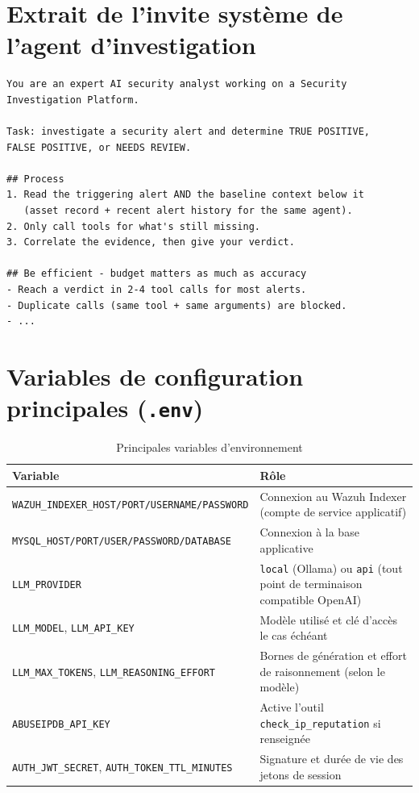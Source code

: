 \section{Extrait de l'invite système de l'agent d'investigation}

\begin{lstlisting}[language={}, caption={Extrait du \textit{system prompt}
de l'AI Investigator}]
You are an expert AI security analyst working on a Security
Investigation Platform.

Task: investigate a security alert and determine TRUE POSITIVE,
FALSE POSITIVE, or NEEDS REVIEW.

## Process
1. Read the triggering alert AND the baseline context below it
   (asset record + recent alert history for the same agent).
2. Only call tools for what's still missing.
3. Correlate the evidence, then give your verdict.

## Be efficient - budget matters as much as accuracy
- Reach a verdict in 2-4 tool calls for most alerts.
- Duplicate calls (same tool + same arguments) are blocked.
- ...
\end{lstlisting}

\section{Variables de configuration principales (\texttt{.env})}

\begin{table}[H]
\centering
\caption{Principales variables d'environnement}
\begin{tabular}{@{}p{5.5cm}p{8cm}@{}}
\toprule
\textbf{Variable} & \textbf{Rôle} \\
\midrule
\texttt{WAZUH\_INDEXER\_HOST/PORT/\allowbreak USERNAME/PASSWORD} & Connexion
au Wazuh Indexer (compte de service applicatif) \\
\texttt{MYSQL\_HOST/PORT/USER/\allowbreak PASSWORD/DATABASE} & Connexion à
la base applicative \\
\texttt{LLM\_PROVIDER} & \texttt{local} (Ollama) ou \texttt{api} (tout
point de terminaison compatible OpenAI) \\
\texttt{LLM\_MODEL}, \texttt{LLM\_API\_KEY} & Modèle utilisé et clé
d'accès le cas échéant \\
\texttt{LLM\_MAX\_TOKENS}, \texttt{LLM\_REASONING\_EFFORT} & Bornes de
génération et effort de raisonnement (selon le modèle) \\
\texttt{ABUSEIPDB\_API\_KEY} & Active l'outil \texttt{check\_ip\_reputation}
si renseignée \\
\texttt{AUTH\_JWT\_SECRET}, \texttt{AUTH\_TOKEN\_TTL\_MINUTES} & Signature
et durée de vie des jetons de session \\
\bottomrule
\end{tabular}
\end{table}

